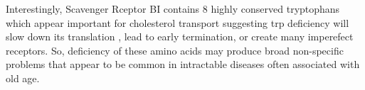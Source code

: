 {Interestingly, Scavenger Rceptor BI contains 8 highly
conserved tryptophans
\cite{Holme_Miller_Nicholson_Tryptophan_Critical_2016}
which appear important for cholesterol transport
suggesting trp deficiency will slow down its translation
, lead to early termination, 
or create many imperefect receptors. 
So, deficiency of these amino acids may produce broad 
non-specific problems that appear to be common
in intractable diseases often associated with old age. 






} %


